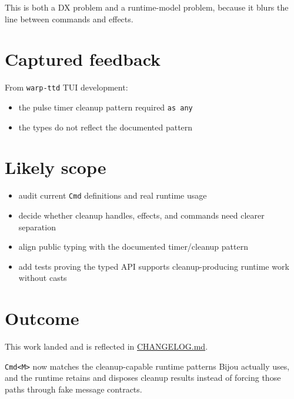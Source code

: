 This is both a DX problem and a runtime-model problem, because it blurs the line between commands and effects.

\section{Captured feedback}\label{record-121-captured-feedback}

From \texttt{w\allowbreak{}a\allowbreak{}r\allowbreak{}p\allowbreak{}-\allowbreak{}t\allowbreak{}t\allowbreak{}d} TUI development:

\begin{itemize}
\tightlist
\item
  the pulse timer cleanup pattern required \texttt{a\allowbreak{}s\allowbreak{} \allowbreak{}a\allowbreak{}n\allowbreak{}y}
\item
  the types do not reflect the documented pattern
\end{itemize}

\section{Likely scope}\label{record-121-likely-scope}

\begin{itemize}
\tightlist
\item
  audit current \texttt{C\allowbreak{}m\allowbreak{}d} definitions and real runtime usage
\item
  decide whether cleanup handles, effects, and commands need clearer separation
\item
  align public typing with the documented timer/cleanup pattern
\item
  add tests proving the typed API supports cleanup-producing runtime work without casts
\end{itemize}

\section{Outcome}\label{record-121-outcome}

This work landed and is reflected in \href{https://github.com/flyingrobots/bijou/blob/cbd70612140e7a450d764b3c7be1c6af878b99bc/docs/CHANGELOG.md}{CHANGELOG.md}.

\texttt{C\allowbreak{}m\allowbreak{}d\allowbreak{}<\allowbreak{}M\allowbreak{}>} now matches the cleanup-capable runtime patterns Bijou actually uses, and the runtime retains and disposes cleanup results instead of forcing those paths through fake message contracts.

